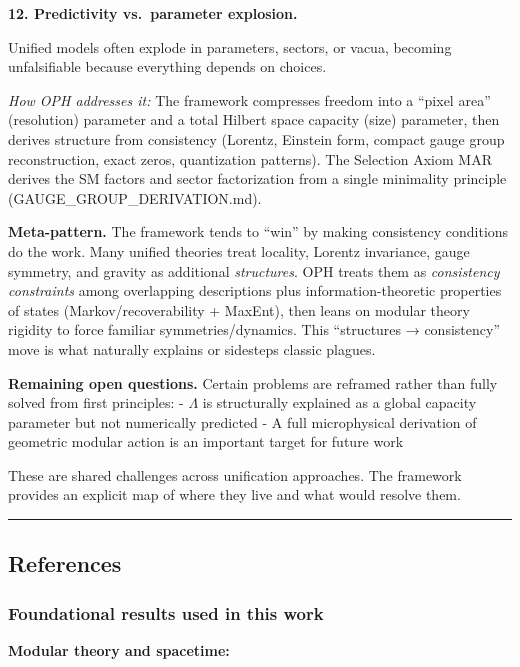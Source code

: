 \documentclass[11pt,a4paper]{article}
\theoremstyle{remark}
\begin{document}
\textbf{12. Predictivity vs.~parameter explosion.}

Unified models often explode in parameters, sectors, or vacua, becoming unfalsifiable because everything depends on choices.

\emph{How OPH addresses it:} The framework compresses freedom into a ``pixel area'' (resolution) parameter and a total Hilbert space capacity (size) parameter, then derives structure from consistency (Lorentz, Einstein form, compact gauge group reconstruction, exact zeros, quantization patterns). The Selection Axiom MAR derives the SM factors and sector factorization from a single minimality principle (GAUGE\_GROUP\_DERIVATION.md).

\textbf{Meta-pattern.} The framework tends to ``win'' by making consistency conditions do the work. Many unified theories treat locality, Lorentz invariance, gauge symmetry, and gravity as additional \emph{structures}. OPH treats them as \emph{consistency constraints} among overlapping descriptions plus information-theoretic properties of states (Markov/recoverability + MaxEnt), then leans on modular theory rigidity to force familiar symmetries/dynamics. This ``structures → consistency'' move is what naturally explains or sidesteps classic plagues.

\textbf{Remaining open questions.} Certain problems are reframed rather than fully solved from first principles:
- \(\Lambda\) is structurally explained as a global capacity parameter but not numerically predicted
- A full microphysical derivation of geometric modular action is an important target for future work

These are shared challenges across unification approaches. The framework provides an explicit map of where they live and what would resolve them.

\begin{center}\rule{0.5\linewidth}{0.5pt}\end{center}

\subsection{References}\label{references}

\subsubsection{Foundational results used in this work}\label{foundational-results-used-in-this-work}

\textbf{Modular theory and spacetime:}
\end{document}
